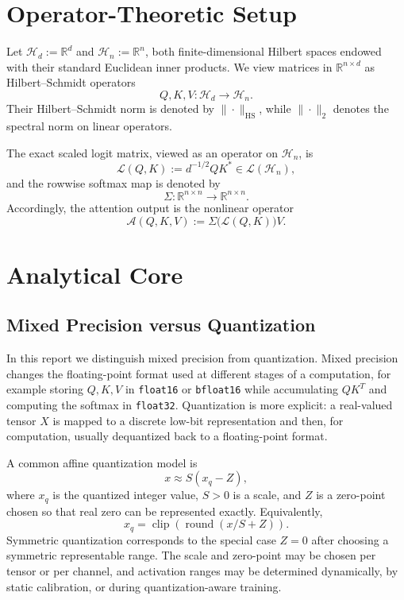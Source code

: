 \section{Operator-Theoretic Setup}

Let $\mathcal{H}_d := \mathbb{R}^d$ and $\mathcal{H}_n := \mathbb{R}^n$, both finite-dimensional Hilbert spaces endowed with their standard Euclidean inner products. We view matrices in $\mathbb{R}^{n \times d}$ as Hilbert--Schmidt operators
\[
    Q,K,V : \mathcal{H}_d \to \mathcal{H}_n.
\]
Their Hilbert--Schmidt norm is denoted by $\|\cdot\|_{\mathrm{HS}}$, while $\|\cdot\|_2$ denotes the spectral norm on linear operators.

The exact scaled logit matrix, viewed as an operator on $\mathcal{H}_n$, is
\[
    \mathcal{L}(Q,K) := d^{-1/2} QK^* \in \mathcal{L}(\mathcal{H}_n),
\]
and the rowwise softmax map is denoted by
\[
    \Sigma : \mathbb{R}^{n \times n} \to \mathbb{R}^{n \times n}.
\]
Accordingly, the attention output is the nonlinear operator
\[
    \mathcal{A}(Q,K,V) := \Sigma\!\bigl(\mathcal{L}(Q,K)\bigr)V.
\]

\section{Analytical Core}

\subsection{Mixed Precision versus Quantization}

In this report we distinguish mixed precision from quantization. Mixed precision changes the floating-point format used at different stages of a computation, for example storing $Q,K,V$ in \texttt{float16} or \texttt{bfloat16} while accumulating $QK^T$ and computing the softmax in \texttt{float32}. Quantization is more explicit: a real-valued tensor $X$ is mapped to a discrete low-bit representation and then, for computation, usually dequantized back to a floating-point format.

A common affine quantization model is
\[
    x \approx S(x_q - Z),
\]
where $x_q$ is the quantized integer value, $S > 0$ is a scale, and $Z$ is a zero-point chosen so that real zero can be represented exactly. Equivalently,
\[
    x_q = \operatorname{clip}\!\left(
        \operatorname{round}(x/S + Z)
    \right).
\]
Symmetric quantization corresponds to the special case $Z = 0$ after choosing a symmetric representable range. The scale and zero-point may be chosen per tensor or per channel, and activation ranges may be determined dynamically, by static calibration, or during quantization-aware training.

